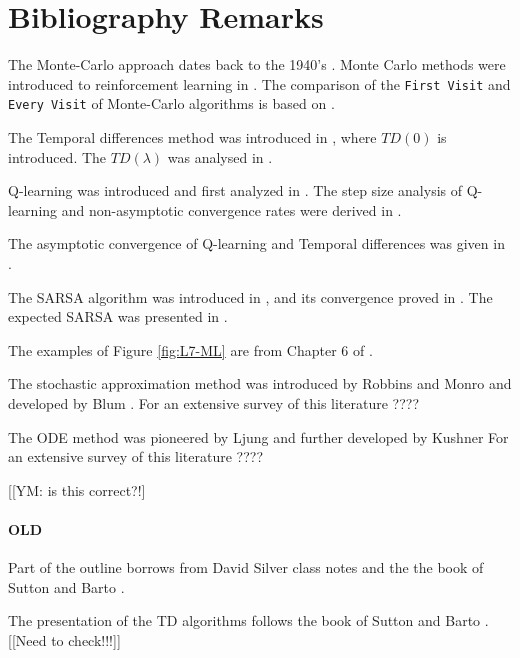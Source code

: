 \begin{advanced}


\end{advanced}


\section{Bibliography Remarks}

The Monte-Carlo approach dates back to the 1940's \cite{MetropolisU49}. Monte Carlo methods were introduced to reinforcement learning in \cite{BartoD93}.
The comparison of the {\tt First Visit} and {\tt Every Visit} of Monte-Carlo algorithms is
based on \cite{SinghS96}.

The Temporal differences method was introduced in \cite{Sutton88}, where $TD(0)$ is introduced. The $TD(\lambda)$ was analysed in \cite{Dayan92,DayanS94}.

Q-learning was introduced and first analyzed in \cite{WatkinsD92}.
The step size analysis of Q-learning and non-asymptotic convergence rates were derived in \cite{Even-DarM03}.

The asymptotic convergence of Q-learning and Temporal differences was given in \cite{JaakkolaJS94,Tsitsiklis94}.

The SARSA algorithm was introduced in \cite{SinghS96}, and its convergence proved in \cite{SinghJLS00}. 
The expected SARSA was presented in \cite{SeijenHWW09}.


The examples of Figure \ref{fig:L7-ML}
are from Chapter 6 of \cite{SuttonB98}.

The stochastic approximation method was introduced by Robbins and  Monro \cite{RobbinsS51} and developed by Blum \cite{Blum54}. For an extensive survey of this literature ????


The ODE method was pioneered by Ljung \cite{Ljung77,LjungS83} and further developed by Kushner \cite{KushnerC78,Kushner84} For an extensive survey of this literature ????

[[YM: is this correct?!]

\paragraph{OLD}






Part of the outline borrows from David Silver class notes and the
the book of Sutton and Barto \cite{SuttonB98}.


The presentation of the TD algorithms follows the book of Sutton and
Barto \cite{SuttonB98}. [[Need to check!!!]]


